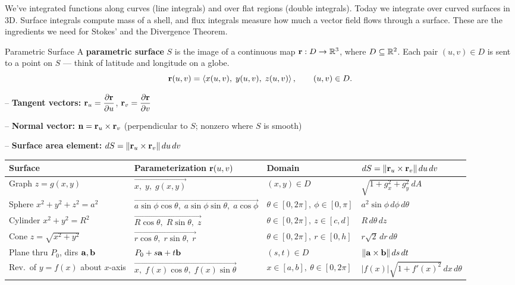 \documentclass[11pt]{article}
\begin{document}

\begin{background}
We've integrated functions along curves (line integrals) and over flat regions (double integrals). Today we integrate over curved surfaces in 3D. Surface integrals compute mass of a shell, and flux integrals measure how much a vector field flows through a surface. These are the ingredients we need for Stokes' and the Divergence Theorem.
\end{background}


\begin{defbox}{Parametric Surface}
A \textbf{parametric surface} $S$ is the image of a continuous map $\mathbf{r}:D\to\mathbb{R}^3$, where $D\subseteq\mathbb{R}^2$. Each pair $(u,v)\in D$ is sent to a point on $S$ — think of latitude and longitude on a globe.
\[\mathbf{r}(u,v) = \left\langle x(u,v),\; y(u,v),\; z(u,v) \right\rangle, \qquad (u,v)\in D.\]

-- \textbf{Tangent vectors:} $\mathbf{r}_u = \dfrac{\partial\mathbf{r}}{\partial u}$, \; $\mathbf{r}_v = \dfrac{\partial\mathbf{r}}{\partial v}$

-- \textbf{Normal vector:} $\mathbf{n} = \mathbf{r}_u \times \mathbf{r}_v$ \; (perpendicular to $S$; nonzero where $S$ is smooth)

-- \textbf{Surface area element:} $dS = \|\mathbf{r}_u \times \mathbf{r}_v\|\,du\,dv$
\end{defbox}


\begin{center}
\footnotesize
\renewcommand{\arraystretch}{1.55}
\begin{tabular}{@{}llll@{}}
\toprule
\textbf{Surface} & \textbf{Parameterization $\mathbf{r}(u,v)$} & \textbf{Domain} & \textbf{$dS=\|\mathbf{r}_u\times\mathbf{r}_v\|\,du\,dv$} \\
\midrule
Graph $z=g(x,y)$ & $\vec{x,\; y,\; g(x,y)}$ & $(x,y)\in D$ & $\sqrt{1+g_x^2+g_y^2}\,dA$ \\
Sphere $x^2+y^2+z^2=a^2$ & $\vec{a\sin\phi\cos\theta,\; a\sin\phi\sin\theta,\; a\cos\phi}$ & $\theta\in[0,2\pi],\ \phi\in[0,\pi]$ & $a^2\sin\phi\,d\phi\,d\theta$ \\
Cylinder $x^2+y^2=R^2$ & $\vec{R\cos\theta,\; R\sin\theta,\; z}$ & $\theta\in[0,2\pi],\ z\in[c,d]$ & $R\,d\theta\,dz$ \\
Cone $z=\sqrt{x^2+y^2}$ & $\vec{r\cos\theta,\; r\sin\theta,\; r}$ & $\theta\in[0,2\pi],\ r\in[0,h]$ & $r\sqrt{2}\,dr\,d\theta$ \\
Plane thru $P_0$, dirs $\mathbf{a},\mathbf{b}$ & $P_0 + s\mathbf{a}+t\mathbf{b}$ & $(s,t)\in D$ & $\|\mathbf{a}\times\mathbf{b}\|\,ds\,dt$ \\
Rev.\ of $y=f(x)$ about $x$-axis & $\vec{x,\; f(x)\cos\theta,\; f(x)\sin\theta}$ & $x\in[a,b],\ \theta\in[0,2\pi]$ & $|f(x)|\sqrt{1+f'(x)^2}\,dx\,d\theta$ \\
\bottomrule
\end{tabular}
\end{center}
\end{document}
